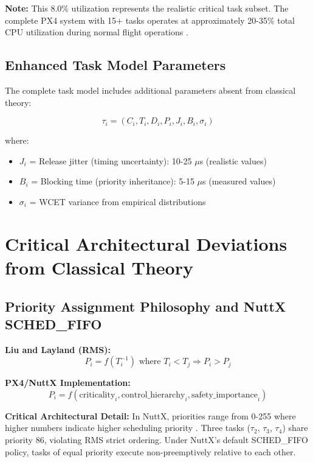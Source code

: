 \documentclass[12pt,a4paper]{article}
\begin{document}
\textbf{Note:} This 8.0\% utilization represents the realistic critical task subset. The complete PX4 system with 15+ tasks operates at approximately 20-35\% total CPU utilization during normal flight operations \cite{px4docs}.

\subsection{Enhanced Task Model Parameters}

The complete task model includes additional parameters absent from classical theory:

\begin{equation}
\tau_i = (C_i, T_i, D_i, P_i, J_i, B_i, \sigma_i)
\end{equation}

where:
\begin{itemize}
\item $J_i$ = Release jitter (timing uncertainty): 10-25 $\mu$s (realistic values)
\item $B_i$ = Blocking time (priority inheritance): 5-15 $\mu$s (measured values)
\item $\sigma_i$ = WCET variance from empirical distributions
\end{itemize}

\section{Critical Architectural Deviations from Classical Theory}

\subsection{Priority Assignment Philosophy and NuttX SCHED\_FIFO}

\textbf{Liu and Layland (RMS):}
\begin{equation}
P_i = f(T_i^{-1}) \text{ where } T_i < T_j \Rightarrow P_i > P_j
\end{equation}

\textbf{PX4/NuttX Implementation:}
\begin{equation}
P_i = f(\text{criticality}_i, \text{control\_hierarchy}_i, \text{safety\_importance}_i)
\end{equation}

\textbf{Critical Architectural Detail:} In NuttX, priorities range from 0-255 where higher numbers indicate higher scheduling priority \cite{nuttx}. Three tasks ($\tau_2$, $\tau_3$, $\tau_4$) share priority 86, violating RMS strict ordering. Under NuttX's default SCHED\_FIFO policy, tasks of equal priority execute non-preemptively relative to each other.
\end{document}
